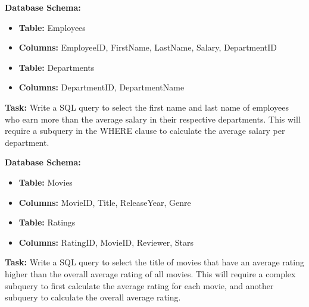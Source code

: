 \begin{exerciseboxcomputer}
\noindent \textbf{Database Schema:} 
\begin{itemize}
    \item \textbf{Table:} Employees
    \item \textbf{Columns:} EmployeeID, FirstName, LastName, Salary, DepartmentID
    \item \textbf{Table:} Departments
    \item \textbf{Columns:} DepartmentID, DepartmentName
\end{itemize}

\noindent \textbf{Task:} Write a SQL query to select the first name and last name of employees who earn more than the average salary in their respective departments. This will require a subquery in the WHERE clause to calculate the average salary per department.\\
\end{exerciseboxcomputer}

\begin{exerciseboxcomputer}
\noindent \textbf{Database Schema:}
\begin{itemize}
    \item \textbf{Table:} Movies
    \item \textbf{Columns:} MovieID, Title, ReleaseYear, Genre
    \item \textbf{Table:} Ratings
    \item \textbf{Columns:} RatingID, MovieID, Reviewer, Stars
\end{itemize}

\noindent \textbf{Task:} Write a SQL query to select the title of movies that have an average rating higher than the overall average rating of all movies. This will require a complex subquery to first calculate the average rating for each movie, and another subquery to calculate the overall average rating.\\
\end{exerciseboxcomputer}
